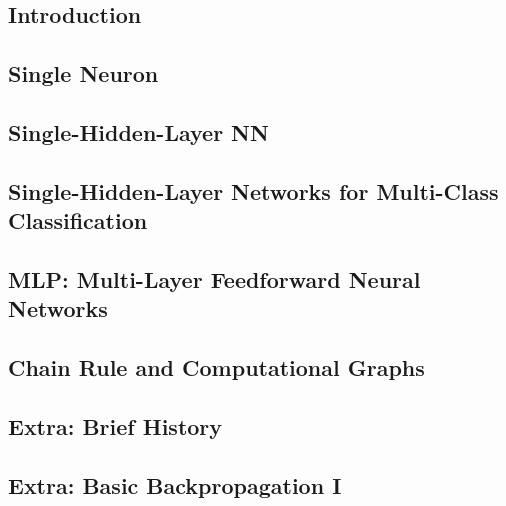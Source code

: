 \subsection{Introduction}


\subsection{Single Neuron}


\subsection{Single-Hidden-Layer NN}


\subsection{Single-Hidden-Layer Networks for Multi-Class Classification}


\subsection{MLP: Multi-Layer Feedforward Neural Networks}


\subsection{Chain Rule and Computational Graphs}


\subsection{Extra: Brief History}


\subsection{Extra: Basic Backpropagation I}

